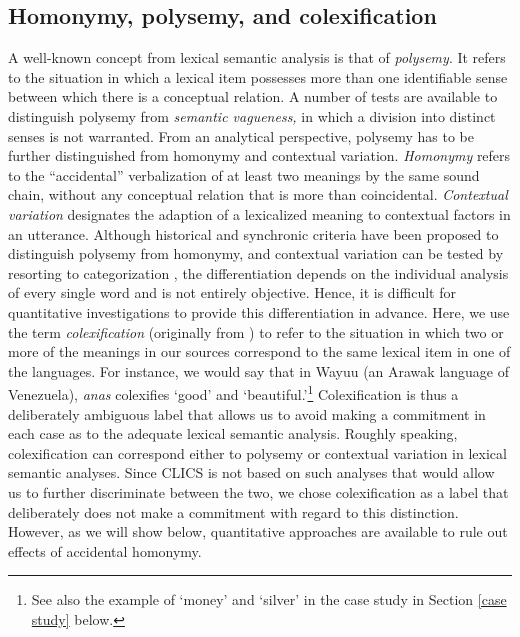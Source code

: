 \subsection{Homonymy, polysemy, and colexification}
A well-known concept from lexical semantic analysis is that of \emph{polysemy}. It refers to the situation
in which a lexical item possesses more than one identifiable sense between which there is a
conceptual relation. A number of tests are available to distinguish polysemy from \emph{semantic
vagueness,} in which a division into distinct senses is not warranted. From an analytical perspective,
polysemy has to be further distinguished from {homonymy} and contextual variation.
\emph{Homonymy} refers to
the ``accidental'' verbalization of at least two meanings by the same sound chain, without any
conceptual relation that is more than coincidental. \emph{Contextual variation}
designates the adaption of a lexicalized meaning to contextual factors in an utterance. Although
historical and synchronic criteria have been proposed to distinguish polysemy from homonymy, and
contextual variation can be tested by resorting to categorization \cite{blank1997}, the
differentiation depends on the individual analysis of every single word and is not entirely
objective. Hence, it is difficult for quantitative investigations to provide this differentiation
in advance.
Here, we use the term \textit{colexification} (originally from ) %
to refer to the situation
in which two or more of the meanings in our sources correspond to the same lexical item in one of
the languages. For instance, %
we would say that in Wayuu (an Arawak language of Venezuela), \textit{anas\textbari} colexifies `good' and `beautiful.'\footnote{See also the example of `money' and `silver' in the case study in Section \ref{case study} below.}
Colexification is thus a deliberately ambiguous label that allows us to avoid making a commitment in
each case as to the adequate lexical semantic analysis.
Roughly speaking,
colexification can correspond either to polysemy or contextual variation in lexical semantic analyses.
Since CLICS is not based on such analyses that would allow us to further discriminate between the
two, we chose colexification as a label that deliberately does not make a commitment with regard to
this distinction. However, as we will show below, quantitative approaches are available to rule out effects of accidental homonymy. 

